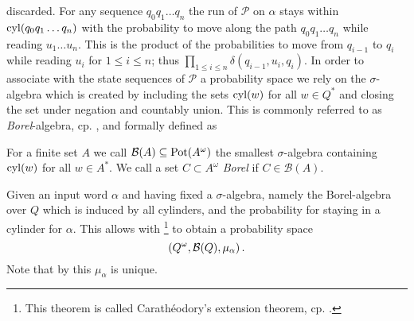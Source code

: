 discarded. For any sequence $q_{0}q_{1}\dots q_{n}$ the run of $\mathcal{P}$
on $\alpha$ stays within $\operatorname{cyl}(q_{0}q_{1}\dots q_{n})$ with the probability to
move along the path $q_{0}q_{1}\dots q_{n}$ while reading $u_{1}\dots u_{n}$.
This is the product of the probabilities to move from $q_{i-1}$ to $q_{i}$
while reading $u_{i}$ for $1\leq i\leq n$; thus 
$\prod_{1\leq i\leq n}\delta(q_{i-1},u_{i},q_{i})$. In order to associate with
the state sequences of $\mathcal{P}$ a probability space we rely on the 
$\sigma$-algebra which is created by including the sets $\operatorname{cyl}(w)$ for all 
$w\in Q^{*}$ and closing the set under negation and countably union. This is
commonly referred to as \emph{Borel}-algebra, cp. \cite{}, and formally 
defined as
\begin{definition}
  For a finite set $A$ we call $\mathcal{B}(A)\subseteq\operatorname{Pot}(A^{\omega})$ the 
  smallest $\sigma$-algebra containing $\operatorname{cyl}(w)$ for all $w\in A^{*}$. We call
  a set $C\subset A^{\omega}$ \emph{Borel} if $C\in\mathcal{B}(A)$.
\end{definition}
Given an input word $\alpha$ and having fixed a $\sigma$-algebra, namely the
Borel-algebra over $Q$ which is induced by all cylinders, and the probability 
for staying in a cylinder for $\alpha$. This allows with 
\cite[Theorem 5.6]{Bauer}\footnote{This theorem is called Carath\'{e}odory's
extension theorem, cp. \cite[Chapter 2.3.]{RandAutoInfTrees}.} to obtain a 
probability space
\begin{equation*}
  \left(Q^{\omega}, \mathcal{B}(Q), \mu_{\alpha}\right).
\end{equation*}
Note that by \cite[Theorem 5.4]{Bauer} this $\mu_{\alpha}$ is unique.


